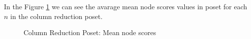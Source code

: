 \documentclass{article}
\begin{document}
\par In the Figure \ref{fig:scores_node_mean_crp} we can see the avarage mean node scores values in poset for each $n$ in the column reduction poset.
\begin{figure}[ht]
  \vspace{-96pt}
  \centering
  \hspace*{-0.19\textwidth}
  \caption{Column Reduction Poset: Mean node scores}
  \label{fig:scores_node_mean_crp}
\end{figure}
\end{document}
